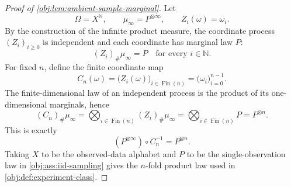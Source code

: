 \begin{proof}[Proof of \cref{obj:lem:ambient-sample-marginal}]
Let
\[
\Omega=X^{\mathbb N},\qquad
\mu_\infty=P^{\otimes\infty},
\qquad
Z_i(\omega)=\omega_i .
\]
By the construction of the infinite product measure, the coordinate process
\((Z_i)_{i\ge0}\) is independent and each coordinate has marginal law \(P\):
\[
(Z_i)_\#\mu_\infty=P
\quad\text{for every }i\in\mathbb N .
\]
For fixed \(n\), define the finite coordinate map
\[
C_n(\omega)=\bigl(Z_i(\omega)\bigr)_{i\in \operatorname{Fin}(n)}
          =\bigl(\omega_i\bigr)_{i=0}^{n-1}.
\]
The finite-dimensional law of an independent process is the product of its one-dimensional marginals, hence
\[
(C_n)_\#\mu_\infty
=
\bigotimes_{i\in\operatorname{Fin}(n)} (Z_i)_\#\mu_\infty
=
\bigotimes_{i\in\operatorname{Fin}(n)} P
=
P^{\otimes n}.
\]
This is exactly
\[
(P^{\otimes\infty})\circ C_n^{-1}=P^{\otimes n}.
\]
Taking \(X\) to be the observed-data alphabet and \(P\) to be the single-observation law in \cref{obj:ass:iid-sampling} gives the \(n\)-fold product law used in \cref{obj:def:experiment-class}.
\end{proof}
